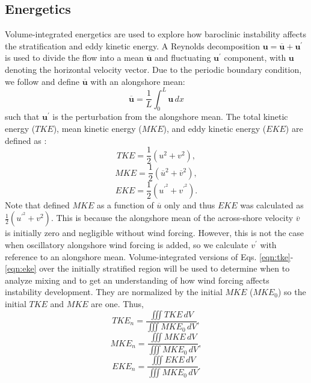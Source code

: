\subsection{Energetics}
Volume-integrated energetics are used to explore how baroclinic instability affects the stratification and eddy kinetic energy. A Reynolds decomposition $\mathbf{u}=\overline{\mathbf{u}}+\mathbf{u}^\prime$ is used to divide the flow into a mean $\overline{\mathbf{u}}$ and fluctuating $\mathbf{u}^\prime$ component, with $\mathbf{u}$ denoting the horizontal velocity vector. Due to the periodic boundary condition, we follow \citet{Hetland_2017} and define $\overline{\mathbf{u}}$ with an alongshore mean:
\begin{equation}
    \overline{\mathbf{u}}=\frac{1}{L} \int_0^L \mathbf{u} \, dx
\end{equation}
such that $\mathbf{u}^\prime$ is the perturbation from the alongshore mean. The total kinetic energy ($TKE$), mean kinetic energy ($MKE$), and eddy kinetic energy ($EKE$) are defined as \citep{cushman2011introduction}:
\begin{equation} \label{eqn:tke}
    TKE = \frac{1}{2}(u^2+v^2) ,
\end{equation}
\begin{equation} \label{eqn:mke}
    MKE = \frac{1}{2}(\overline{u}^2+\overline{v}^2) ,
\end{equation}
\begin{equation} \label{eqn:eke}
    EKE = \frac{1}{2}(u^{\prime^2}+v^{\prime^2}) .
\end{equation}
Note that \citet{Hetland_2017} defined $MKE$ as a function of $\overline{u}$ only and thus $EKE$ was calculated as $\frac{1}{2}(u^{\prime^2}+v^{2})$. This is because the alongshore mean of the across-shore velocity $\overline{v}$ is initially zero and negligible without wind forcing. However, this is not the case when oscillatory alongshore wind forcing is added, so we calculate $v^\prime$ with reference to an alongshore mean. Volume-integrated versions of Eqs. \ref{eqn:tke}-\ref{eqn:eke} over the initially stratified region will be used to determine when to analyze mixing and to get an understanding of how wind forcing affects instability development. They are normalized by the initial $MKE$ ($MKE_0$) so the initial $TKE$ and $MKE$ are one. Thus, 
\begin{equation}
    TKE_n = \frac{\iiint TKE \, dV}{\iiint MKE_0 \, dV},
\end{equation}
\begin{equation}
    MKE_n = \frac{\iiint M
    KE \, dV}{\iiint MKE_0 \, dV},
\end{equation}
\begin{equation}
    EKE_n = \frac{\iiint EKE \, dV}{\iiint MKE_0 \, dV}.
\end{equation}

